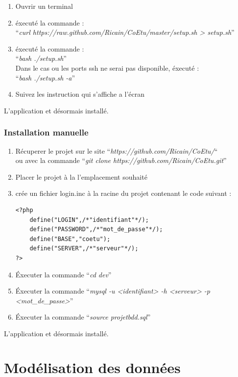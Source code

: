 \documentclass[a4paper,10pt]{report}
\begin{document}
\begin{enumerate}
    \item Ouvrir un terminal
    \item \'execut\'e la commande : \\
          ``\textit{curl https://raw.github.com/Ricain/CoEtu/master/setup.sh > setup.sh}''
    \item \'execut\'e la commande : \\
          ``\textit{bash ./setup.sh}'' \\
          Dans le cas ou les ports ssh ne serai pas disponible, \'execut\'e : \\
          ``\textit{bash ./setup.sh -a}''
    \item Suivez les instruction qui s'affiche a l'\'ecran    
\end{enumerate}

L'application et d\'esormais install\'e.
\newpage
\subsection{Installation manuelle}

\begin{enumerate}
    \item R\'ecuperer le projet sur le site ``\textit{https://github.com/Ricain/CoEtu/}``\\
          ou avec la commande ``\textit{git clone https://github.com/Ricain/CoEtu.git}''
    \item Placer le projet \`a la l'emplacement souhait\'e
    \item cr\'ee un fichier login.inc \`a la racine du projet contenant le code suivant :
    \begin{lstlisting}
<?php
    define("LOGIN",/*"identifiant"*/);
    define("PASSWORD",/*"mot_de_passe"*/);
    define("BASE","coetu");
    define("SERVER",/*"serveur"*/);
?>
    \end{lstlisting}
    \item \'Executer la commande ``\textit{cd dev}''
    \item \'Executer la commande ``\textit{mysql -u <identifiant> -h <serveur> -p <mot\_de\_passe>}''
    \item \'Executer la commande ``\textit{source projetbdd.sql}''
\end{enumerate}

L'application et d\'esormais install\'e.

\chapter{Mod\'elisation des donn\'ees}
\end{document}
